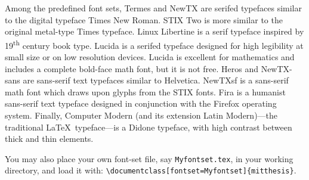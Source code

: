 \documentclass[11pt]{article}
\begin{document}
Among the predefined font sets, Termes and NewTX are serifed typefaces similar to the digital typeface Times New Roman.  STIX Two is more similar to the original metal-type Times typeface. Linux Libertine is a serif typeface inspired by 19\textsuperscript{th} century book type. Lucida is a serifed typeface designed for high legibility at small size or on low resolution devices. Lucida is excellent for mathematics and includes a complete bold-face math font, but it is not free. Heros and NewTX-sans are sans-serif text typefaces similar to Helvetica. NewTXsf is a sans-serif math font which draws upon glyphs from the STIX fonts. Fira is a humanist sans-serif text typeface designed in conjunction with the Firefox operating system. Finally, Computer Modern (and its extension Latin Modern)---the traditional \LaTeX\ typeface---is a Didone typeface, with high contrast between thick and thin elements.   

You may also place your own font-set file, say \texttt{Myfontset.tex}, in your working directory, and load it with:
\verb|\documentclass[fontset=Myfontset]{mitthesis}|.
\end{document}
